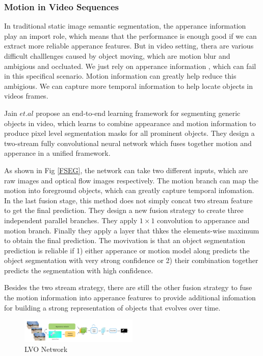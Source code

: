\subsubsection{Motion in Video Sequences}
In traditional static image semantic segmentation, the apperance information play an import role, which means that 
the performance is enough good if we can extract more reliable apperance features. But in video setting, thera are various
difficult challlenges caused by object moving, which are motion blur and ambigious and occluated. We just rely on apperance information
, which can  fail in this specifical scenario. Motion information can greatly help reduce this ambigious. We can capture more temporal information
to help locate objects in videos frames.

Jain $et.al$ \cite{Jain2017FusionSeg} propose an end-to-end learning framework for segmenting generic objects in video,
which learns to combine appearance and motion information to produce pixel level segmentation masks for all prominent objects.
They design a two-stream fully convolutional neural network which fuses together motion and apperance in a unified framework.

As shown in Fig \ref{FSEG}, the network can take two different inputs, which are raw images and optical flow images respectively.
The motion branch can map the motion into foreground objects, which can greatly capture temporal infomation.
In the last fusion stage, this method does not simply concat two stream feature to get the final prediction.
They design a new fusion strategy to create three independent parallel branches. They apply $1\times1$ convolution to apperance and
motion branch. Finally they apply a layer that thkes the elements-wise maximum to obtain the final prediction. The movivation is that 
an object segmentation prediction is reliable if 1) either apperance or motion model along predicts the object 
segmentation with very strong confidence or 2) their combination together predicts the segmentation with high confidence. 

Besides the two stream strategy, there are still the other fusion strategy to fuse the motion information into apperance 
features to provide additional infomation for building a strong representation of objects that evolves over time. 

\begin{figure}[ht]
    \centering
    \includegraphics[width=0.5\textwidth]{./figure/LVO_NET.png}
    \caption{LVO Network}
    \label{LVO}
\end{figure}

